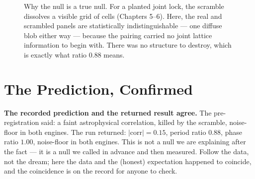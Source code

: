 \documentclass[11pt, letterpaper, openany]{book}
\begin{document}
\begin{figure}[H]
\centering
{}
\caption{Why the null is a true null. For a planted joint lock, the scramble dissolves a visible
grid of cells (Chapters 5--6). Here, the real and scrambled panels are statistically
indistinguishable --- one diffuse blob either way --- because the pairing carried no joint lattice
information to begin with. There was no structure to destroy, which is exactly what ratio $0.88$
means.}
\end{figure}

\section{The Prediction, Confirmed}

\begin{signalbox}
\textbf{The recorded prediction and the returned result agree.} The pre-registration said: a
faint astrophysical correlation, killed by the scramble, noise-floor in both engines. The run
returned: $|\mathrm{corr}| = 0.15$, period ratio $0.88$, phase ratio $1.00$, noise-floor in both
engines. This is not a null we are explaining after the fact --- it is a null we called in advance
and then measured. Follow the data, not the dream; here the data and the (honest) expectation
happened to coincide, and the coincidence is on the record for anyone to check.
\end{signalbox}
\end{document}
